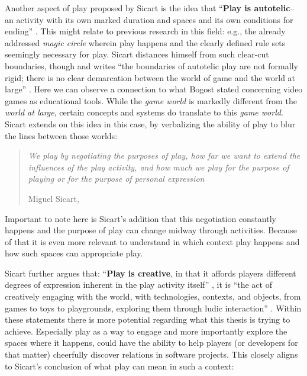 Another aspect of play proposed by Sicart is the idea that \enquote{\textbf{Play is autotelic}--an activity with its own marked duration and spaces and its own conditions for ending} \cite[p. 16]{sicart2014play}. This might relate to previous research in this field: e.g., the already addressed \textit{magic circle} wherein play happens and the clearly defined rule sets seemingly necessary for play. Sicart distances himself from such clear-cut boundaries, though and writes \enquote{the boundaries of autotelic play are not formally rigid; there is no clear demarcation between the world of game and the world at large} \cite[p. 16]{sicart2014play}. Here we can observe a connection to what Bogost stated concerning video games as educational tools. While the \textit{game world} is markedly different from the \textit{world at large}, certain concepts and systems do translate to this \textit{game world}. Sicart extends on this idea in this case, by verbalizing the ability of play to blur the lines between those worlds:

\begin{quote}
  \textit{We play by negotiating the purposes of play, how far we want to extend the influences of the play activity, and how much we play for the purpose of playing or for the purpose of personal expression}

  \footnotesize{Miguel Sicart, \cite[p. 16]{sicart2014play}}
\end{quote}

Important to note here is Sicart's addition that this negotiation constantly happens and the purpose of play can change midway through activities. Because of that it is even more relevant to understand in which context play happens and how such spaces can appropriate play.

Sicart further argues that: \enquote{\textbf{Play is creative}, in that it affords players different degrees of expression inherent in the play activity itself} \cite[p. 17]{sicart2014play}, it is \enquote{the act of creatively engaging with the world, with technologies, contexts, and objects, from games to toys to playgrounds, exploring them through ludic interaction} \cite[p. 17]{sicart2014play}. Within these statements there is more potential regarding what this thesis is trying to achieve. Especially play as a way to engage and more importantly explore the spaces where it happens, could have the ability to help players (or developers for that matter) cheerfully discover relations in software projects. This closely aligns to Sicart's conclusion of what play can mean in such a context:

